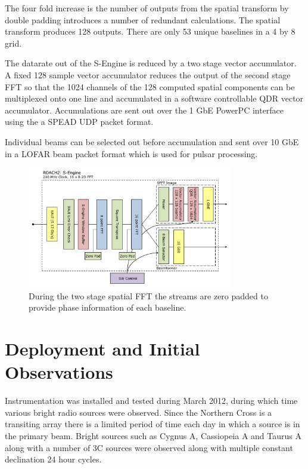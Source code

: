 \documentclass[useAMS,macros,usenatbib]{mn2e}
\begin{document}
The four fold increase is the number of outputs from the spatial transform by double padding introduces a number of redundant calculations.
The spatial transform produces 128 outputs.
There are only 53 unique baselines in a 4 by 8 grid.

The datarate out of the S-Engine is reduced by a two stage vector accumulator.
A fixed 128 sample vector accumulator reduces the output of the second stage FFT so that the 1024 channels of the 128 computed spatial components can be multiplexed onto one line and accumulated in a software controllable QDR vector accumulator.
Accumulations are sent out over the 1 GbE PowerPC interface using the a SPEAD UDP packet format.

Individual beams can be selected out before accumulation and sent over 10 GbE in a LOFAR beam packet format which is used for pulsar processing.

\begin{figure}
    \centering
    \includegraphics[width=0.8\textwidth]{graphics/crop_sengine_block.pdf}
    \caption{During the two stage spatial FFT the streams are zero padded to provide phase information of each baseline.}
    \label{fig:seng_block}
\end{figure}

\section{Deployment and Initial Observations}
\label{observations}

Instrumentation was installed and tested during March 2012, during which time various bright radio sources were observed.
Since the Northern Cross is a transiting array there is a limited period of time each day in which a source is in the primary beam.
Bright sources such as Cygnus A, Cassiopeia A and Taurus A along with a number of 3C sources were observed along with multiple constant declination 24 hour cycles.
\end{document}
